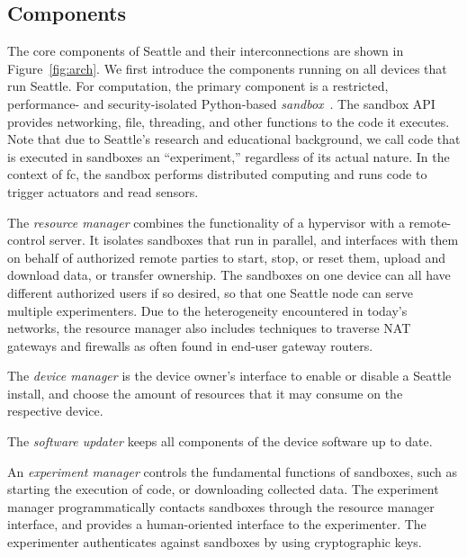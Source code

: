 \subsection{Components}\label{sec-components}

The core components of Seattle and their interconnections are
shown in Figure~\ref{fig:arch}.
We first introduce the components running on all devices that
run Seattle.
For computation, the primary component is a restricted,
performance- and security-isolated Python-based
\textit{sandbox}~\cite{RepySandbox,li2015fence}.
The sandbox \gls{API} provides
networking, file, threading, and other functions to
the code it executes. Note that
due to Seattle's research and educational background, we
call code that is executed in sandboxes an ``experiment,''
regardless of its actual nature.
In the context of \gls{fc}, the sandbox performs distributed
computing and runs code to trigger actuators and read sensors.

The \textit{resource manager} combines the functionality of
a hypervisor with a remote-control server.
It isolates %
sandboxes that run in
parallel, and interfaces with them on behalf of authorized remote
parties to start, stop, or reset them, upload and download data,
or transfer ownership. The sandboxes on one
device can all have different authorized users if so desired,
so that one Seattle node can serve multiple experimenters.
Due to the heterogeneity encountered in today's networks,
the resource manager also includes techniques to traverse
\gls{NAT} gateways and firewalls as often found in end-user
gateway routers.

The \textit{device manager} %
is the device owner's interface to enable or disable a Seattle
install, and choose the amount of resources that it may consume on the respective
device.

The \textit{software updater} keeps all components of the
device software up to date.

An \textit{experiment manager} controls the fundamental functions of sandboxes, such as
starting the execution of code, or downloading collected data.
The experiment manager programmatically contacts sandboxes
through the resource manager interface, and provides a
human-oriented interface to the experimenter. The experimenter
authenticates against sandboxes by using cryptographic keys.

